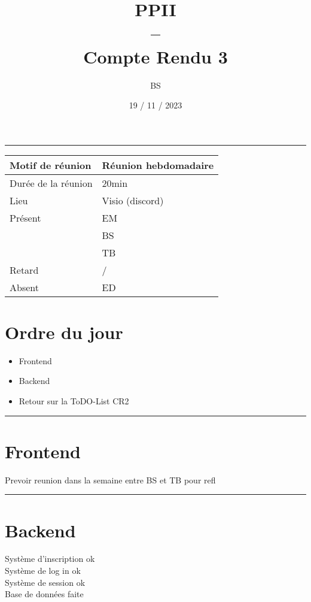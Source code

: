 \documentclass[10pt,a4paper]{report}
\title{PPII \\ -- \\ Compte Rendu 3}
\date{19 / 11 / 2023}
\author{BS}
\begin{document}
\maketitle

\tableofcontents \bigskip

\noindent\rule{\linewidth}{0.5mm} \bigskip

                \begin{tabular}{|l | l|}
                        \hline
                Motif de réunion & Réunion hebdomadaire \\
                        \hline
                Durée de la réunion & 20min \\
                        \hline
                Lieu & Visio (discord) \\
                        \hline
                Présent & EM \\
                        & BS \\
                        & TB  \\
                        \hline
                Retard  & / \\
                        \hline
                Absent  & ED \\
                        \hline
                \end{tabular}


\section{Ordre du jour}
\begin{itemize}
        \item Frontend
        \item Backend
        \item Retour sur la ToDO-List CR2
\end{itemize}

\noindent\rule{\linewidth}{0.5mm} \bigskip
\section{Frontend}
Prevoir reunion dans la semaine entre BS et TB pour refl


\noindent\rule{\linewidth}{0.5mm} \bigskip
\section{Backend}
Système d'inscription ok \\
Système de log in ok \\
Système de session ok \\
Base de données faite \\
\end{document}
